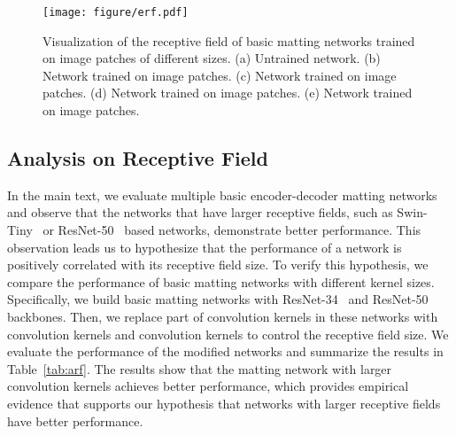 \documentclass[10pt,twocolumn,letterpaper]{article}
\begin{document}
\begin{figure}[!t]
    \begin{center}
    \texttt{[image: figure/erf.pdf]}
       \end{center}
            \vspace{-15pt}
    \caption{ Visualization of the receptive field of basic matting networks trained on image patches of different sizes. (a) Untrained network. (b) Network trained on  image patches. (c) Network trained on  image patches. (d) Network trained on  image patches. (e) Network trained on  image patches. }
    \label{fig:rf}
    \vspace{-5pt}
\end{figure}


\subsection{Analysis on Receptive Field}
In the main text, we evaluate multiple basic encoder-decoder matting networks and observe that the networks that have larger receptive fields, such as Swin-Tiny~\cite{liu2021Swin} or ResNet-50~\cite{he2016deep} based networks, demonstrate better performance. 
This observation leads us to hypothesize that the performance of a network is positively correlated with its receptive field size. 
To verify this hypothesis, we compare the performance of basic matting networks with different kernel sizes.
Specifically, we build basic matting networks with ResNet-34~\cite{he2016deep} and ResNet-50 backbones. 
Then, we replace part of   convolution kernels in these networks with  convolution kernels and    convolution kernels to control the receptive field size.
We evaluate the performance of the modified networks and summarize the results in Table~\ref{tab:arf}.
The results show that the matting network with larger convolution kernels achieves better performance, which provides empirical evidence that supports our hypothesis that networks with larger receptive fields have better performance.



\begin{table}[!t]
  \centering
  \caption{Diagnostic experiment on the kernel size. } 
  \label{tab:arf}\end{table}
\end{document}
